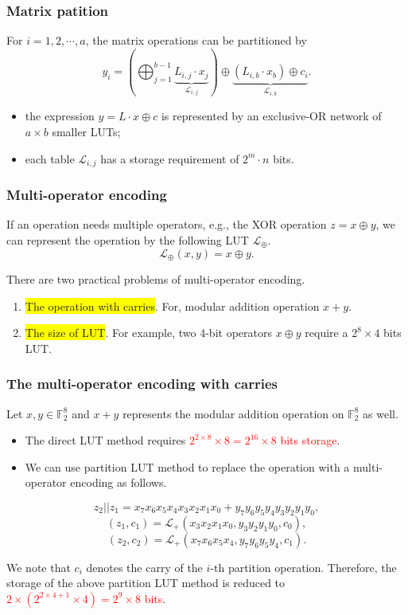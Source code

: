 \documentclass{beamer}
\begin{document}
\frame
{
\frametitle{Matrix patition}
For $i = 1, 2, \cdots, a$, the matrix operations can be partitioned by
\[ y_{i} = (\bigoplus^{b-1}_{j=1} \underbrace{L_{i,j} \cdot x_{j}}_{\mathcal{L}_{i,j}}) \oplus \underbrace{(L_{i, b} \cdot x_{b}) \oplus c_{i}}_{\mathcal{L}_{i,b}}.\]

\begin{itemize}
\item the expression $y=L\cdot x \oplus c$ is represented by an exclusive-OR network of $a\times b$ smaller LUTs;

\item each table $\mathcal{L}_{i,j}$ has a storage requirement of $2^{m}\cdot n$ bits.
\end{itemize}
}

\frame
{
\frametitle{Multi-operator encoding}
If an operation needs multiple operators, e.g., the XOR operation $z = x \oplus y$, we can represent the operation by the following LUT $\mathcal{L}_{\oplus}$.
\[ \mathcal{L}_{\oplus}(x, y) = x \oplus y .\]

There are two practical problems of multi-operator encoding. 
\begin{enumerate}
\item \colorbox{yellow}{The operation with carries}. For, modular addition operation $x + y$.
\item \colorbox{yellow}{The size of LUT}. For example, two 4-bit operators $x \oplus y$ require a $2^{8}\times 4$ bits LUT.
\end{enumerate}
}

\frame
{
\frametitle{The multi-operator encoding with carries}
Let $x, y \in \mathbb{F}^{8}_{2}$ and $x + y$ represents the modular addition operation on $\mathbb{F}^{8}_{2}$ as well. 
\begin{itemize}
\item The direct LUT method requires \textcolor{red} {$2^{2\times 8}\times 8 = 2^{16} \times 8$ bits storage}.
\item We can use partition LUT method to replace the operation with a multi-operator encoding as follows.
\end{itemize}
\[ z_{2}||z_{1} = x_{7}x_{6}x_{5}x_{4}x_{3}x_{2}x_{1}x_{0} + y_{7}y_{6}y_{5}y_{4}y_{3}y_{2}y_{1}y_{0},\]
\[ (z_{1}, c_{1}) = \mathcal{L}_{+}(x_{3}x_{2}x_{1}x_{0}, y_{3}y_{2}y_{1}y_{0}, c_{0}),\]
\[ (z_{2},  c_{2})= \mathcal{L}_{+}(x_{7}x_{6}x_{5}x_{4}, y_{7}y_{6}y_{5}y_{4}, c_{1}).\]

We note that $c_{i}$ denotes the carry of the $i$-th partition operation. Therefore, the storage of the above partition LUT method is reduced to \textcolor{red}{$2\times (2^{2\times 4 + 1} \times 4) = 2^9 \times 8$ bits}.
}
\end{document}
